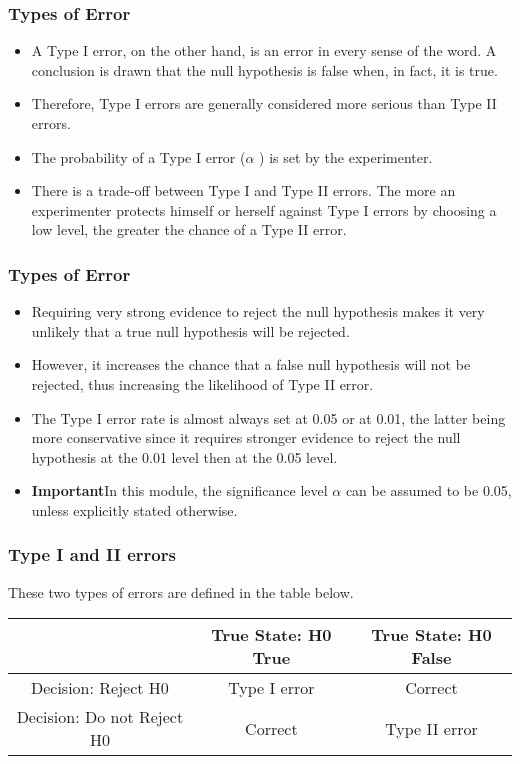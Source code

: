 \documentclass[a4]{beamer}
\begin{document}
\begin{frame}
\frametitle{Types of Error}
\large
\begin{itemize}
\item
A Type I error, on the other hand, is an error in every sense of the word. A conclusion is drawn that the null hypothesis is false when, in fact, it is true. \item Therefore, Type I errors are generally considered more serious than Type II errors.
\item
The probability of a Type I error ($\alpha$ ) is set by the experimenter. \item There is a trade-off between Type I and Type II errors. The more an experimenter protects himself or herself against Type I errors by choosing a low level, the greater the chance of a Type II error.
\end{itemize}
\end{frame}
\begin{frame}
\frametitle{Types of Error}
\large
\begin{itemize}
\item
Requiring very strong evidence to reject the null hypothesis makes it very unlikely that a true null hypothesis will be rejected. \item However, it increases the chance that a false null hypothesis will not be rejected, thus increasing the likelihood of Type II error.
\item
The Type I error rate is almost always set at 0.05 or at 0.01, the latter being more conservative since it requires stronger evidence to reject the null hypothesis at the 0.01 level then at the 0.05 level.
\item \textbf{Important}In this module, the significance level $\alpha$ can be assumed to be 0.05, unless explicitly stated otherwise.
\end{itemize}
\end{frame}
\begin{frame}
\frametitle{Type I and II errors}
\large
These two types of errors are defined in the table below.
\small
\begin{center}
\begin{tabular}{|c|c|c|}
\hline
&True State: H0 True & True State: H0 False\\\hline
Decision: Reject H0 & Type I error& Correct\\\hline
Decision: Do not Reject H0 & Correct &Type II error\\ \hline
\end{tabular}
\end{center}
\end{frame}
\end{document}
